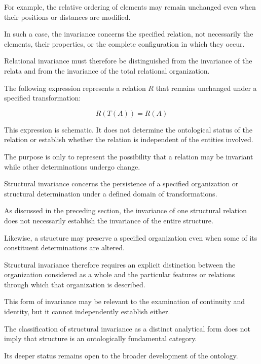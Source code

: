 For example, the relative ordering
of elements may remain unchanged
even when their positions or
distances are modified.

In such a case, the invariance
concerns the specified relation,
not necessarily the elements,
their properties, or the complete
configuration in which they occur.

Relational invariance must therefore
be distinguished from the invariance
of the relata and from the invariance
of the total relational organization.

The following expression represents
a relation \(R\) that remains
unchanged under a specified
transformation:

\[
R(T(A)) = R(A)
\]

This expression is schematic.
It does not determine the ontological
status of the relation or establish
whether the relation is independent
of the entities involved.

The purpose is only to represent
the possibility that a relation
may be invariant while other
determinations undergo change.


Structural invariance concerns
the persistence of a specified
organization or structural
determination under a defined
domain of transformations.

As discussed in the preceding
section, the invariance of one
structural relation does not
necessarily establish the
invariance of the entire structure.

Likewise, a structure may preserve
a specified organization even
when some of its constituent
determinations are altered.

Structural invariance therefore
requires an explicit distinction
between the organization considered
as a whole and the particular
features or relations through
which that organization is described.

This form of invariance may be
relevant to the examination of
continuity and identity, but
it cannot independently establish
either.

The classification of structural
invariance as a distinct analytical
form does not imply that structure
is an ontologically fundamental
category.

Its deeper status remains open
to the broader development of
the ontology.


